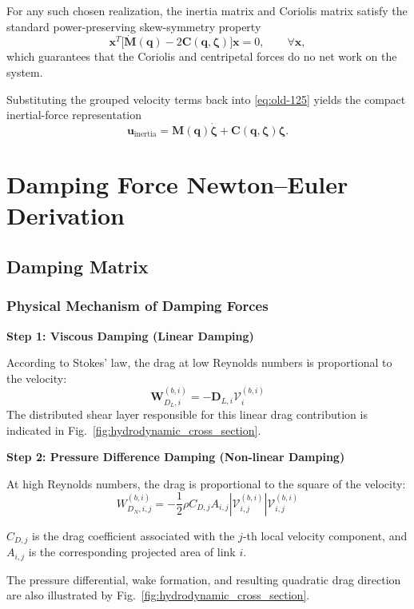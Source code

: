 \documentclass[12pt,a4paper]{report}
\newcommand{\newsymbols}[1]{\par\noindent{}#1\par\vspace{0.35em}}
\begin{document}
For any such chosen realization, the inertia matrix and Coriolis matrix satisfy the standard power-preserving skew-symmetry property
\begin{equation}
\mathbf{x}^T \bigl[ \dot{\mathbf{M}}(\mathbf{q}) - 2\mathbf{C}(\mathbf{q},\boldsymbol{\zeta}) \bigr] \mathbf{x} = 0,
\qquad
\forall \mathbf{x},
\label{eq:old-127}
\end{equation}
which guarantees that the Coriolis and centripetal forces do no net work on the system.

Substituting the grouped velocity terms back into \eqref{eq:old-125} yields the compact inertial-force representation
\begin{equation}
\mathbf{u}_{\text{inertia}}
=
\mathbf{M}(\mathbf{q}) \dot{\boldsymbol{\zeta}}
+
\mathbf{C}(\mathbf{q},\boldsymbol{\zeta})\boldsymbol{\zeta}.
\label{eq:old-128}
\end{equation}

\chapter{Damping Force Newton--Euler Derivation}

\section{Damping Matrix}

\subsection{Physical Mechanism of Damping Forces}

\textbf{Step 1: Viscous Damping (Linear Damping)}

According to Stokes' law, the drag at low Reynolds numbers is proportional to the velocity:
\begin{equation}
\mathbf{W}_{D_L,i}^{(b,i)} = -\mathbf{D}_{L,i} \mathcal{V}_i^{(b,i)}
\label{eq:old-129}
\end{equation}
The distributed shear layer responsible for this linear drag contribution is indicated in Fig.~\ref{fig:hydrodynamic_cross_section}.

\textbf{Step 2: Pressure Difference Damping (Non-linear Damping)}

At high Reynolds numbers, the drag is proportional to the square of the velocity:
\begin{equation}
W_{D_N,i,j}^{(b,i)} = -\frac{1}{2} \rho C_{D,j} A_{i,j} \left|\mathcal{V}_{i,j}^{(b,i)}\right| \mathcal{V}_{i,j}^{(b,i)}
\label{eq:old-130}
\end{equation}
\newsymbols{$C_{D,j}$ is the drag coefficient associated with the $j$-th local velocity component, and $A_{i,j}$ is the corresponding projected area of link $i$.}
The pressure differential, wake formation, and resulting quadratic drag direction are also illustrated by Fig.~\ref{fig:hydrodynamic_cross_section}.
\end{document}
